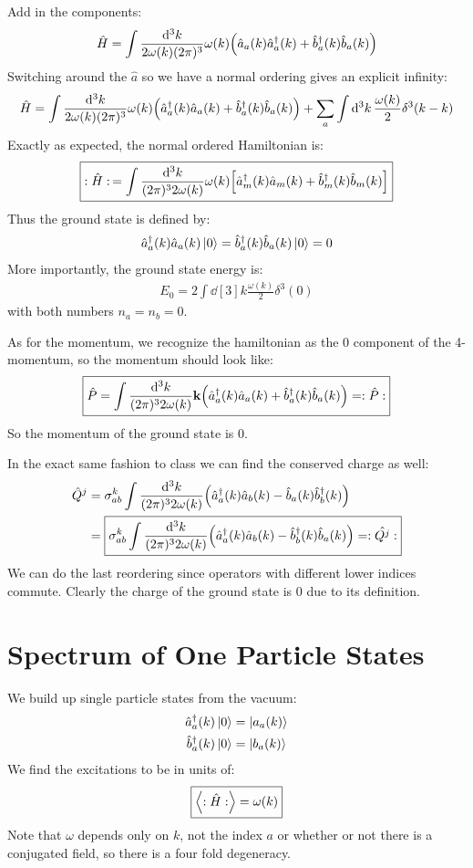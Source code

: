\documentclass[12pt]{article}
\newcommand{\ahat}{\hat{a}}
\newcommand{\ahatd}{\hat{a}^\dag}
\newcommand{\bhat}{\hat{b}}
\newcommand{\bhatd}{\hat{b}^\dag}
\begin{document}
Add in the components:
\begin{align*}
  \hat{H}=\int\frac{\dd[3]{k}}{2\omega(k)(2\pi)^3}\omega(k)
  \qty(\ahat_a(k)\ahatd_a(k)+\bhatd_a(k)\bhat_a(k))
\end{align*}
Switching around the $\ahat$ so we have a normal ordering gives an explicit infinity:
\begin{align*}
  \hat{H}=\int\frac{\dd[3]{k}}{2\omega(k)(2\pi)^3}\omega(k)
  \qty(\ahatd_a(k)\ahat_a(k)+\bhatd_a(k)\bhat_a(k))
  +\sum_a\int\dd[3]{k}\frac{\omega(k)}{2}\delta^3(k-k)
\end{align*}
Exactly as expected, the normal ordered Hamiltonian is:
\begin{align*}
  \boxed{:\hat{H}:\,= \int\frac{\dd[3]{k}}{(2\pi)^32\omega(k)}\omega(k)
  \qty[\ahatd_m(k)\ahat_m(k)+\bhatd_m(k)\bhat_m(k)]}
\end{align*}
Thus the ground state is defined by:
\begin{align*}
  \ahatd_a(k)\ahat_a(k)\ket{0}=\bhatd_a(k)\bhat_a(k)\ket{0}=0
\end{align*}
More importantly, the ground state energy is:
\begin{align*}
  \boxed{E_0=2\int\dd[3]{k}\frac{\omega(k)}{2}\delta^3(0)}
\end{align*}
with both numbers $n_a=n_b=0$.

As for the momentum, we recognize the hamiltonian as the $0$ component of the 4-momentum, so the momentum should look like:
\begin{align*}
  \boxed{\hat{P}=\int\frac{\dd[3]{k}}{(2\pi)^32\omega(k)}\vb{k}
    \qty(\ahatd_a(k)\ahat_a(k)+\bhatd_a(k)\bhat_a(k))=:\hat{P}:}
\end{align*}
So the momentum of the ground state is $0$.

In the exact same fashion to class we can find the conserved charge as well:
\begin{align*}
  \hat{Q}^j&=\sigma^k_{ab}\int\frac{\dd[3]{k}}{(2\pi)^32\omega(k)}
  \qty(\ahatd_a(k)\ahat_b(k)-\bhat_a(k)\bhatd_b(k))\\
  &=\boxed{\sigma^k_{ab}\int\frac{\dd[3]{k}}{(2\pi)^32\omega(k)}
  \qty(\ahatd_a(k)\ahat_b(k)-\bhatd_b(k)\bhat_a(k))=:\hat{Q^j}:}
\end{align*}
We can do the last reordering since operators with different lower indices commute. Clearly the charge of the ground state is $0$ due to its definition. 
\section{Spectrum of One Particle States}
We build up single particle states from the vacuum:
\begin{align*}
  \ahatd_a(k)\ket{0}&=\ket{a_a(k)}\\
  \bhatd_a(k)\ket{0}&=\ket{b_a(k)}
\end{align*}
We find the excitations to be in units of:
\begin{align*}
  \boxed{\ev{:\hat{H}:}=\omega(k)}
\end{align*}
Note that $\omega$ depends only on $k$, not the index $a$ or whether or not there is a conjugated field, so there is a four fold degeneracy.
\end{document}
